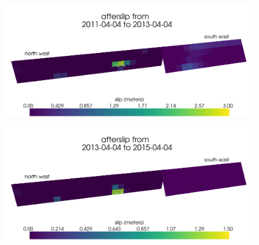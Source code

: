 \documentclass[12pt]{article}
\begin{document}
\begin{figure}
\includegraphics[scale=0.1]{Figures/final_afterslip_1-3}
\centering 
\caption{}
\label{ShearRatio}
\end{figure} 

\begin{figure}
\includegraphics[scale=0.1]{Figures/final_afterslip_3-5}
\centering 
\caption{}
\label{ShearRatio}
\end{figure} 
\end{document}
